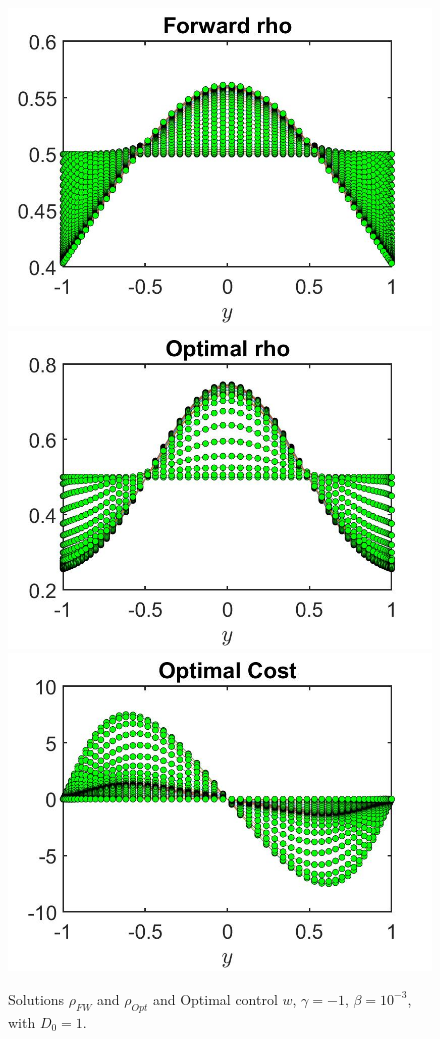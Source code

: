 \documentclass[11pt, a4paper]{article}
\theoremstyle{definition}
\begin{document}
\begin{figure}[h]
	\includegraphics[scale=0.3]{rhoFWD03a.jpg}	\includegraphics[scale=0.3]{rhoOptD03a.jpg}
	\includegraphics[scale=0.3]{wOptD03a.jpg}
	\caption{Solutions $\rho_{FW}$ and $\rho_{Opt}$ and Optimal control $w$, $\gamma = - 1$, $\beta = 10^{-3}$, with $D_0 = 1$.}
	\label{rhoD03a}
\end{figure}
\end{document}
